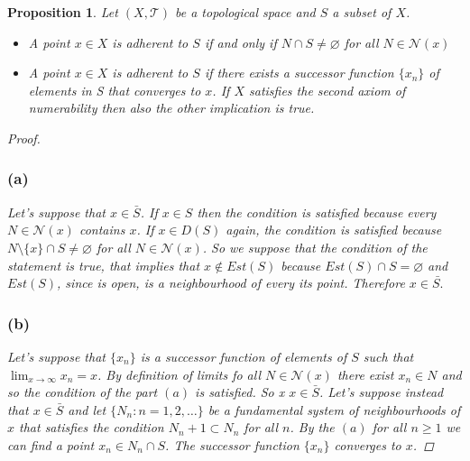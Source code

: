 \documentclass{article}
\newtheorem{proposition}{Proposition}
\begin{document}
    \begin{proposition}
        Let $(X, \mathcal{T})$ be a topological space and $S$ a subset of $X$.
        \begin{itemize}
            \item[a)] A point $x\in X$ is adherent to $S$ if and only if $N \cap S \neq \varnothing$ for all $N\in \mathcal{N}(x)$ 
            \item[b)] A point $x\in X$ is adherent to $S$ if there exists a successor function $\{x_n \}$ of elements in S that converges to $x$. If $X$ satisfies the second axiom of numerability then also the other implication is true. 
        \end{itemize}
        \begin{proof}
            \subsubsection*{(a)} Let's suppose that $x \in \bar{S}$. If $x \in S$ then the condition is satisfied because every $N\in \mathcal{N}(x)$ contains $x$. If $x\in D(S)$ again, the condition is satisfied because $N\setminus \{x \}\cap S \neq \varnothing $ for all $N\in \mathcal{N}(x)$. So we suppose that the condition of the statement is true, that implies that $x \notin Est(S)$ because $Est(S)\cap S = \varnothing$ and $Est(S)$, since is open, is a neighbourhood of every its point. Therefore $x\in \bar{S.}$
            \subsubsection*{(b)} Let's suppose that $\{ x_n \}$ is a successor function of elements of $S$ such that $\lim_{x \to \infty} x_n = x$. By definition of limits fo all $N \in \mathcal{N}(x)$ there exist $x_n \in N$ and so the condition of the part $(a)$ is satisfied. So x $x\in \bar{S}$. Let's suppose instead that $x\in \bar{S}$ and let $\{ N_n : n=1,2,\ldots  \}$ be a fundamental system of neighbourhoods of $x$ that satisfies the condition $N_n+1 \subset N_n$ for all $n$. By the $(a)$ for all $n \geq 1$ we can find a point $x_n \in N_n \cap S$. The successor function $\{ x_n \}$ converges to $x$.
        \end{proof}
    \end{proposition}
    \newpage
\end{document}
